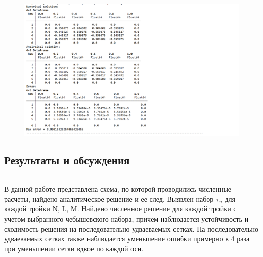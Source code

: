 \documentclass[12pt,a4paper, titlepage]{article}
\begin{document}
\begin{figure}[H]
	\centering
	\includegraphics[width = 1.0\textwidth]{lab5_6_2.png}
\end{figure}

\subsection*{Результаты и обсуждения}
\noindent\rule{\textwidth}{1pt}
В данной работе представлена схема, по которой проводились численные расчеты, найдено аналитическое решение и ее след. Выявлен набор $\tau_n$ для каждой тройки N, L, M. Найдено численное решение для каждой тройки с учетом выбранного чебышевского набора, причем наблюдается устойчивость и сходимость решения на последовательно удваеваемых сетках. На последовательно удваеваемых сетках также наблюдается уменьшение ошибки примерно в 4 раза при уменьшении сетки вдвое по каждой оси.
\end{document}
